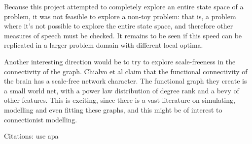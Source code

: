 \documentclass[12pt]{article}
\begin{document}
Because this project attempted to completely explore an entire state space of a problem, it was not feasible to explore a non-toy problem: that is, a problem where it's not possible to explore the entire state space, and therefore other measures of speech must be checked. It remains to be seen if this speed can be replicated in a larger problem domain with different local optima.

Another interesting direction would be to try to explore scale-freeness in the connectivity of the graph. Chialvo et al claim that the functional connectivity of the brain has a scale-free network character. The functional graph they create is a small world net, with a power law distribution of degree rank and a bevy of other features. This is exciting, since there is a vast literature on simulating, modelling and even fitting these graphs, and this might be of interest to connectionist modelling.

\begin{thebibliography}[99]
    Citations:   use apa
\end{thebibliography}
\end{document}
